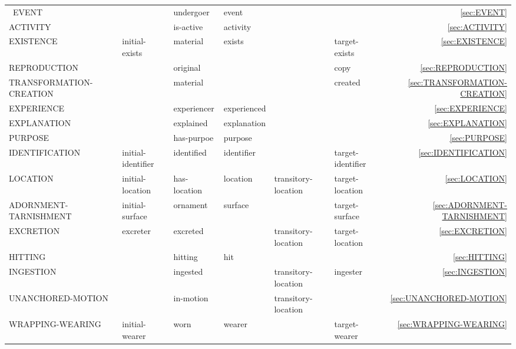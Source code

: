 \documentclass[a4paper]{article}
\newcommand{\fr}[1]{\textsf{#1}}
\newcommand{\rl}[1]{\textsf{#1}}
\newcommand{\Sub}{\textnoto{└} }
\newcommand{\SubSub}{\textcolor{white}{\Sub}\Sub}
\begin{document}
\begin{table}
{\begin{NiceTabular}{llllllr}
            \Sub{}\ \fr{EVENT} & & \rl{undergoer} & \rl{event} & & & \ref{sec:EVENT} \\
            \SubSub{} \fr{ACTIVITY} & & \rl{is-active} & \rl{activity} & & & \ref{sec:ACTIVITY} \\

            \Sub{} \fr{EXISTENCE} & initial-exists & material & \rl{exists} & & target-exists & \ref{sec:EXISTENCE} \\
            \SubSub{} \fr{REPRODUCTION} & & \rl{original} & & & \rl{copy} & \ref{sec:REPRODUCTION} \\
            \SubSub{} \fr{TRANSFORMATION-CREATION} & & \rl{material} & & & \rl{created} & \ref{sec:TRANSFORMATION-CREATION} \\

            \Sub{} \fr{EXPERIENCE} & & \rl{experiencer} & \rl{experienced} &  &  & \ref{sec:EXPERIENCE} \\

            \Sub{} \fr{EXPLANATION} & & \rl{explained} & \rl{explanation} & & & \ref{sec:EXPLANATION} \\
            \SubSub{} \fr{PURPOSE} & & \rl{has-purpoe} & \rl{purpose} & & & \ref{sec:PURPOSE} \\

            \Sub{} \fr{IDENTIFICATION} & \rl{initial-identifier} & \rl{identified} & \rl{identifier} & & \rl{target-identifier} & \ref{sec:IDENTIFICATION} \\

            \Sub{} \fr{LOCATION} & \rl{initial-location} & \rl{has-location} & \rl{location} & \rl{transitory-location} & \rl{target-location} & \ref{sec:LOCATION} \\
            \SubSub{} \fr{ADORNMENT-TARNISHMENT} & \rl{initial-surface} & \rl{ornament} & \rl{surface} & & \rl{target-surface} & \ref{sec:ADORNMENT-TARNISHMENT} \\
            \SubSub{} \fr{EXCRETION} & \rl{excreter} & \rl{excreted} & & \rl{transitory-location} & \rl{target-location} & \ref{sec:EXCRETION} \\
            \SubSub{} \fr{HITTING} & & \rl{hitting} & \rl{hit} & & & \ref{sec:HITTING} \\
            \SubSub{} \fr{INGESTION} & & \rl{ingested} & & \rl{transitory-location} & \rl{ingester} & \ref{sec:INGESTION} \\
            \SubSub{} \fr{UNANCHORED-MOTION} & & \rl{in-motion} & & \rl{transitory-location} & & \ref{sec:UNANCHORED-MOTION} \\
            \SubSub{} \fr{WRAPPING-WEARING} & \rl{initial-wearer} & \rl{worn} & \rl{wearer} & & \rl{target-wearer} & \ref{sec:WRAPPING-WEARING} \\


\end{NiceTabular}}
\end{table}
\end{document}
